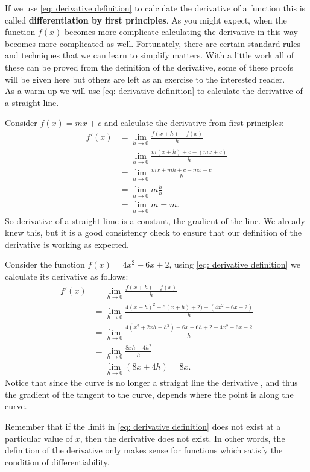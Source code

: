 If we use \cref{eq: derivative definition} to calculate the derivative of a function this is called \textbf{differentiation by first principles}. As you might expect, when the function $f(x)$ becomes more complicate calculating the derivative in this way becomes more complicated as well. Fortunately, there are certain standard rules and techniques that we can learn to simplify matters. With a little work all of these can be proved from the definition of the derivative, some of these proofs will be given here but others are left as an exercise to the interested reader.\\

As a warm up we will use \cref{eq: derivative definition} to calculate the derivative of a straight line.
\begin{ex}
Consider $f(x)=mx+c$ and calculate the derivative from first principles:
\begin{align*}
f'(x)	&=\lim_{h\to 0}\frac{f(x+h)-f(x)}{h}\\
	&=\lim_{h\to 0}\frac{m(x+h)+c-(mx+c)}{h}\\
	&=\lim_{h\to 0}\frac{mx+mh+c-mx-c}{h}\\
	&=\lim_{h\to 0}m\frac{h}{h}\\
	&=\lim_{h\to 0}m=m.
\end{align*}
So derivative of a straight lime is a constant, the gradient of the line. We already knew this, but it is a good consistency check to ensure that our definition of the derivative is working as expected.
\end{ex}

\begin{ex}
Consider the function $f(x)=4x^2 -6x +2$, using \cref{eq: derivative definition} we calculate its derivative as follows:
\begin{align*}
f'(x)	&=\lim_{h\to 0}\frac{f(x+h)-f(x)}{h}\\
	&=\lim_{h\to 0}\frac{4(x+h)^2 -6(x+h) +2)-(4x^2 -6x +2)}{h}\\
	&=\lim_{h\to 0}\frac{4(x^{2}+2xh+h^{2})-6x-6h+2-4x^{2}+6x-2}{h}\\
	&=\lim_{h\to 0}\frac{8xh+4h^{2}}{h}\\
	&=\lim_{h\to 0}\left(8x+4h\right)=8x.
\end{align*}
Notice that since the curve is no longer a straight line the derivative , and thus the gradient of the tangent to the curve, depends where the point is along the curve. 
\end{ex}

Remember that if the limit in \cref{eq: derivative definition} does not exist at a particular value of $x$, then the derivative does not exist. In other words, the definition of the derivative only makes sense for functions which satisfy the condition of differentiability.

